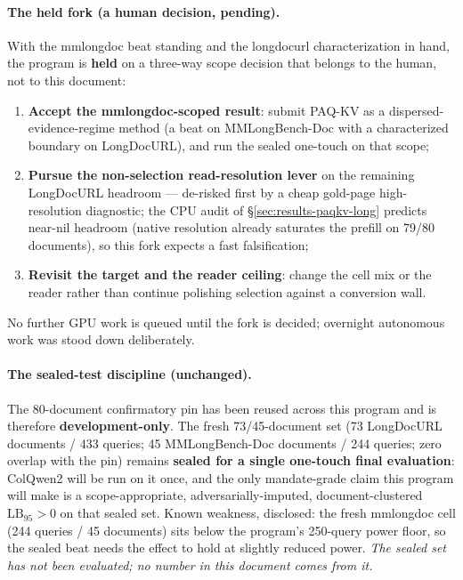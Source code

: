 \documentclass[11pt,letterpaper]{article}
\newcommand{\paqc}{\textsc{PAQ-KV}}
\newcommand{\lb}{\mathrm{LB}_{95}}
\begin{document}
\paragraph{The held fork (a human decision, pending).} With the mmlongdoc beat standing and
the longdocurl characterization in hand, the program is \textbf{held} on a three-way scope
decision that belongs to the human, not to this document:
\begin{enumerate}
  \item \textbf{Accept the mmlongdoc-scoped result}: submit \paqc{} as a
        dispersed-evidence-regime method (a beat on MMLongBench-Doc with a characterized
        boundary on LongDocURL), and run the sealed one-touch on that scope;
  \item \textbf{Pursue the non-selection read-resolution lever} on the remaining LongDocURL
        headroom --- de-risked first by a cheap gold-page high-resolution diagnostic; the CPU
        audit of \S\ref{sec:results-paqkv-long} predicts near-nil headroom (native resolution
        already saturates the prefill on 79/80 documents), so this fork expects a fast
        falsification;
  \item \textbf{Revisit the target and the reader ceiling}: change the cell mix or the reader
        rather than continue polishing selection against a conversion wall.
\end{enumerate}
No further GPU work is queued until the fork is decided; overnight autonomous work was stood
down deliberately.

\paragraph{The sealed-test discipline (unchanged).} The 80-document confirmatory pin has been
reused across this program and is therefore \textbf{development-only}. The fresh
73/45-document set (73 LongDocURL documents / 433 queries; 45 MMLongBench-Doc documents / 244
queries; zero overlap with the pin) remains \textbf{sealed for a single one-touch final
evaluation}: ColQwen2 will be run on it once, and the only mandate-grade claim this program
will make is a scope-appropriate, adversarially-imputed, document-clustered $\lb>0$ on that
sealed set. Known weakness, disclosed: the fresh mmlongdoc cell (244 queries / 45 documents)
sits below the program's 250-query power floor, so the sealed beat needs the effect to hold at
slightly reduced power. \emph{The sealed set has not been evaluated; no number in this
document comes from it.}
\end{document}
